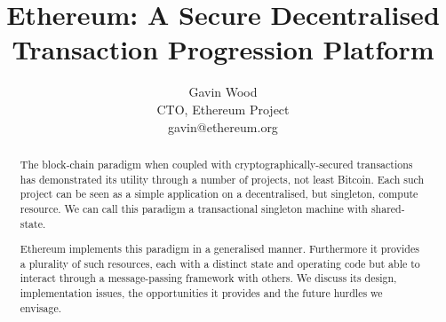 \documentclass[9pt,oneside]{amsart}
\title{Ethereum: A Secure Decentralised Transaction Progression Platform}
\author{
    Gavin Wood\\
    CTO, Ethereum Project\\
    gavin@ethereum.org
}
\begin{document}
\begin{abstract}
The block-chain paradigm when coupled with cryptographically-secured transactions has demonstrated its utility through a number of projects, not least Bitcoin. Each such project can be seen as a simple application on a decentralised, but singleton, compute resource. We can call this paradigm a transactional singleton machine with shared-state.

Ethereum implements this paradigm in a generalised manner. Furthermore it provides a plurality of such resources, each with a distinct state and operating code but able to interact through a message-passing framework with others. We discuss its design, implementation issues, the opportunities it provides and the future hurdles we envisage.
\end{abstract}

\maketitle
\end{document}
